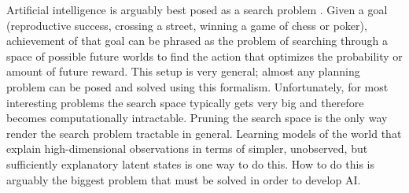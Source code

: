\documentclass[12pt]{article}
\begin{document}
\noindent Artificial intelligence is arguably best posed as a search problem \cite{Russell2002}.  Given a goal (reproductive success, crossing a street, winning a game of chess or poker), achievement of that goal can be phrased as the problem of searching through a space of possible future worlds to find the action that optimizes the probability or amount of future reward.  %
This setup is very general; almost any planning problem can be posed and solved using this formalism.  Unfortunately, for most interesting problems the search space typically gets very big and therefore becomes computationally intractable.
Pruning the search space is the only way render the search problem tractable in general.  Learning models of the world that explain high-dimensional observations in terms of simpler, unobserved, but sufficiently explanatory latent states is one way to do this.  How to do this is arguably the biggest problem that must be solved in order to develop AI.   %
\end{document}
